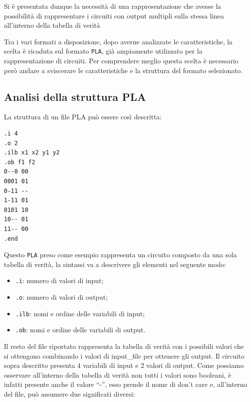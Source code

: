 \documentclass[italian,]{book}
\providecommand{\tightlist}{%
  \setlength{\itemsep}{0pt}\setlength{\parskip}{0pt}}
\begin{document}
\newpage

Si è presentata dunque la necessità di una rappresentazione che avesse la possibilità di rappresentare i circuiti con output multipli sulla stessa linea all'interno della tabella di verità

Tra i vari formati a disposizione, dopo averne analizzate le caratteristiche, la scelta è ricaduta sul formato \texttt{PLA}, già ampiamente utilizzato per la rappresentazione di circuiti.
Per comprendere meglio questa scelta è necessario però andare a sviscerare le caratteristiche e la struttura del formato selezionato.

\hypertarget{analisi-della-struttura-pla}{%
\subsection{Analisi della struttura PLA}\label{analisi-della-struttura-pla}}

La struttura di un file PLA può essere così descritta:

\begin{verbatim}
.i 4
.o 2
.ilb x1 x2 y1 y2
.ob f1 f2
0--0 00    
0001 01
0-11 --
1-11 01
0101 10
10-- 01
11-- 00
.end
\end{verbatim}

Questo \texttt{PLA} preso come esempio rappresenta un circuito composto da una sola tabella di verità, la sintassi va a descrivere gli elementi nel seguente modo:

\begin{itemize}
\tightlist
\item
  \texttt{.i}: numero di valori di input;
\item
  \texttt{.o}: numero di valori di output;
\item
  \texttt{.ilb}: nomi e ordine delle variabili di input;
\item
  \texttt{.ob}: nomi e ordine delle variabili di output.
\end{itemize}

\newpage

Il resto del file riportato rappresenta la tabella di verità con i possibili valori che si ottengono combinando i valori di input\_file per ottenere gli output. Il circuito sopra descritto presenta 4 variabili di input e 2 valori di output. Come possiamo osservare all'interno della tabella di verità non tutti i valori sono booleani, è infatti presente anche il valore ``-'', esso prende il nome di don't care e, all'interno del file, può assumere due significati diversi:
\end{document}
